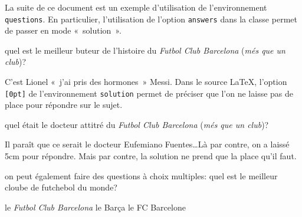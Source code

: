 \documentclass[addpoints,fr,biblatex,name,gradetable,marksdetail,markssum]{isae-exam}
\begin{document}
La suite de ce document est un exemple d'utilisation de
l'environnement \lstinline!questions!. En particulier, l'utilisation
de l'option \lstinline!answers! dans la classe permet de passer en
mode «~solution~».

\begin{questions}
\question[1] quel est le meilleur buteur de l'histoire du \textit{Futbol
  Club Barcelona} (\textit{més que un club})?

\begin{solution}[0pt]

  C'est Lionel «~j'ai pris des hormones~» Messi. Dans le source
  \LaTeX, l'option \lstinline![0pt]! de l'environnement
  \lstinline!solution! permet de préciser que l'on ne laisse pas de
  place pour répondre sur le sujet.
\end{solution}



\question[1\half] quel était le docteur attitré du \textit{Futbol
  Club Barcelona} (\textit{més que un club})?

\begin{solution}[5cm]

  Il paraît que ce serait le docteur Eufemiano Fuentes\ldots Là par
  contre, on a laissé 5cm pour répondre. Mais par contre, la
  solution ne prend que la place qu'il faut.
\end{solution}


\question[\half] on peut également faire des questions à choix multiples:
quel est le meilleur cloube de futchebol du monde?

\begin{checkboxes}
  \CorrectChoice le \textit{Futbol Club Barcelona}
  \choice le Barça
  \choice le FC Barcelone
\end{checkboxes}
\end{questions}
\end{document}
